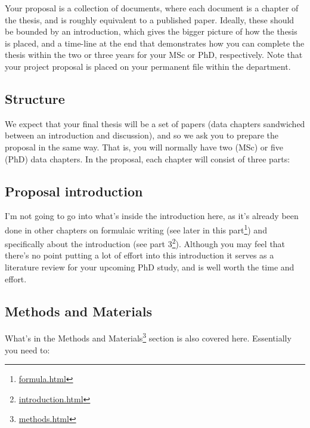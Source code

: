 \documentclass[
]{krantz}
\renewcommand{\href}[2]{#2\footnote{\url{#1}}}
\begin{document}
Your proposal is a collection of documents, where each document is a chapter of the thesis, and is roughly equivalent to a published paper. Ideally, these should be bounded by an introduction, which gives the bigger picture of how the thesis is placed, and a time-line at the end that demonstrates how you can complete the thesis within the two or three years for your MSc or PhD, respectively. Note that your project proposal is placed on your permanent file within the department.

\hypertarget{structure}{%
\subsection{Structure}\label{structure}}

We expect that your final thesis will be a set of papers (data chapters sandwiched between an introduction and discussion), and so we ask you to prepare the proposal in the same way. That is, you will normally have two (MSc) or five (PhD) data chapters. In the proposal, each chapter will consist of three parts:

\hypertarget{proposal-introduction}{%
\subsection{Proposal introduction}\label{proposal-introduction}}

I'm not going to go into what's inside the introduction here, as it's already been done in other chapters on formulaic writing (see later in this \href{formula.html}{part}) and specifically about the introduction (see \href{introduction.html}{part 3}). Although you may feel that there's no point putting a lot of effort into this introduction it serves as a literature review for your upcoming PhD study, and is well worth the time and effort.

\hypertarget{methods-and-materials}{%
\subsection{Methods and Materials}\label{methods-and-materials}}

What's in the \href{methods.html}{Methods and Materials} section is also covered here. Essentially you need to:
\end{document}
